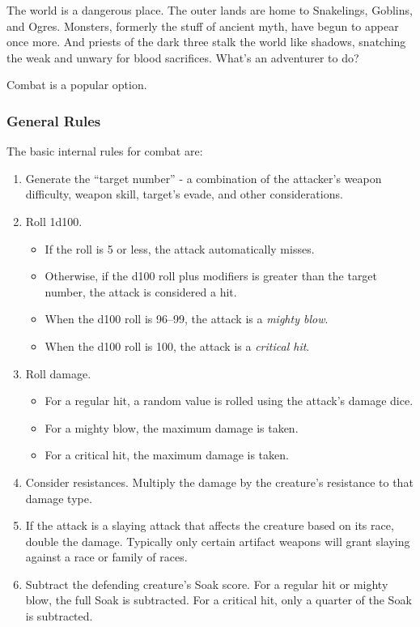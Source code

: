 The world is a dangerous place.  The outer lands are home to Snakelings,
Goblins, and Ogres.  Monsters, formerly the stuff of ancient myth, have
begun to appear once more.  And priests of the dark three stalk the world
like shadows, snatching the weak and unwary for blood sacrifices.  What's
an adventurer to do?

Combat is a popular option.

\subsubsection{General Rules}

The basic internal rules for combat are:

\begin{enumerate}
\item Generate the ``target number'' - a combination of the attacker's
weapon difficulty, weapon skill, target's evade, and other considerations.

\item Roll 1d100.
  \begin{itemize}
  \item If the roll is 5 or less, the attack automatically misses.

  \item Otherwise, if the d100 roll plus modifiers is greater than the 
  target number, the attack is considered a hit.  

  \item When the d100 roll is 96--99, the attack is a {\it mighty blow}.

  \item When the d100 roll is 100, the attack is a {\it critical hit}.
  \end{itemize}
\item Roll damage.
  \begin{itemize}
  \item For a regular hit, a random value is rolled using the attack's
  damage dice.

  \item For a mighty blow, the maximum damage is taken.

  \item For a critical hit, the maximum damage is taken.
  \end{itemize}

\item Consider resistances.  Multiply the damage by the creature's
resistance to that damage type.

\item If the attack is a slaying attack that affects the creature based on
its race, double the damage.  Typically only certain artifact weapons will
grant slaying against a race or family of races.

\item Subtract the defending creature's Soak score.  For a regular hit
or mighty blow, the full Soak is subtracted.  For a critical hit, only a
quarter of the Soak is subtracted.
\end{enumerate}

